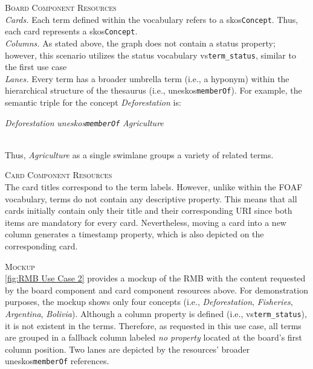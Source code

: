 \vspace*{\baselineskip}

\noindent \textsc{Board Component Resources}\\[-1.5em]

\noindent \hangindent=1.7cm \textit{Cards.}\tabto{1.7cm} Each term defined within the  vocabulary refers to a \acrshort{skos}\texttt{Concept}. Thus, each card represents a \acrshort{skos}\texttt{Concept}.\\[-1.5em]

\noindent \hangindent=1.7cm \textit{Columns.}\tabto{1.7cm} As stated above, the  graph does not contain a status property; however, this scenario utilizes the status vocabulary \acrshort{vs}\texttt{term\_status}, similar to the first use case\\[-1.5em]

\noindent \hangindent=1.7cm \textit{Lanes.}\tabto{1.7cm} Every  term has a broader umbrella term (i.e., a hyponym) within the hierarchical structure of the thesaurus (i.e., \acrshort{uneskos}\texttt{memberOf}). For example, the semantic triple for the concept \textit{Deforestation} is:\\
\centerline{\textit{Deforestation} \textrightarrow{} \textit{\acrshort{uneskos}\texttt{memberOf}} \textrightarrow{} \textit{Agriculture}}\\
Thus, \textit{Agriculture} as a single swimlane groups a variety of related  terms.


\vspace*{\baselineskip}
\newpage

\noindent \textsc{Card Component Resources}\\
\noindent The card titles correspond to the  term labels. However, unlike within the \acrshort*{FOAF} vocabulary,  terms do not contain any descriptive property. This means that all cards initially contain only their title and their corresponding \acrshort*{URI} since both items are mandatory for every card. Nevertheless, moving a card into a new column generates a timestamp property, which is also depicted on the corresponding card.


\vspace*{\baselineskip}

\noindent \textsc{Mockup}\\
\noindent \autoref{fig:RMB Use Case 2} provides a mockup of the \acrshort*{RMB} with the content requested by the board component and card component resources above. For demonstration purposes, the mockup shows only four  concepts (i.e., \textit{Deforestation}, \textit{Fisheries}, \textit{Argentina}, \textit{Bolivia}). Although a column property is defined (i.e., \acrshort{vs}\texttt{term\_status}), it is not existent in the  terms. Therefore, as requested in this use case, all terms are grouped in a fallback column labeled \textit{no property} located at the board’s first column position. Two lanes are depicted by the resources’ broader \acrshort{uneskos}\texttt{memberOf} references.



